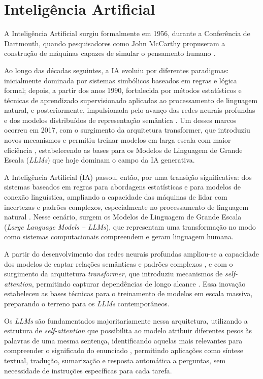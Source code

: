 \section{Inteligência Artificial}

A Inteligência Artificial surgiu formalmente em 1956, durante a Conferência de Dartmouth, quando pesquisadores 
como John McCarthy propuseram a construção de máquinas capazes de simular o pensamento humano \cite{RussellNorvig2021}. 

Ao longo das décadas seguintes, a IA evoluiu por diferentes paradigmas: inicialmente dominada por sistemas simbólicos 
baseados em regras e lógica formal; depois, a partir dos anos 1990, fortalecida por métodos estatísticos e técnicas de 
aprendizado supervisionado aplicadas ao processamento de linguagem natural,
e posteriormente, impulsionada pelo avanço das redes neurais profundas e dos modelos distribuídos de representação 
semântica \cite{Goodfellow2016}. Um desses marcos ocorreu em 2017, com o surgimento da arquitetura transformer, que 
introduziu novos mecanismos e permitiu treinar modelos em larga escala com maior eficiência
\cite{Vaswani2017}, estabelecendo as bases para os Modelos de Linguagem de Grande Escala (\textit{LLMs}) que hoje dominam o 
campo da IA generativa.

A Inteligência Artificial (IA) passou, então, por uma transição significativa: dos sistemas baseados em regras para 
abordagens estatísticas e para modelos de conexão linguística, ampliando a capacidade das máquinas de lidar com incertezas e 
padrões complexos, especialmente no processamento de linguagem natural \cite{RussellNorvig2021}. Nesse cenário, 
surgem os Modelos de Linguagem de Grande Escala (\textit{Large Language Models – LLMs}), que representam uma transformação no 
modo como sistemas computacionais compreendem e geram linguagem humana.

A partir do desenvolvimento das redes neurais profundas ampliou-se a capacidade dos modelos de captar relações 
semânticas e padrões complexos \cite{Goodfellow2016}, e com o surgimento da arquitetura \textit{transformer}, que introduziu mecanismos 
de \textit{self-attention}, permitindo capturar dependências de longo alcance \cite{Vaswani2017}. 
Essa inovação estabeleceu as bases técnicas para o treinamento de modelos em escala massiva, preparando o terreno para os \textit{LLMs} contemporâneos.

Os \textit{LLMs} são fundamentados majoritariamente nessa arquitetura, utilizando a estrutura de \textit{self-attention} que possibilita ao modelo atribuir 
diferentes pesos às palavras de uma mesma sentença, identificando aquelas mais relevantes para compreender o significado 
do enunciado \cite{Vaswani2017}, permitindo aplicações como síntese textual, tradução, sumarização e resposta automática 
a perguntas, sem necessidade de instruções específicas para cada tarefa.

